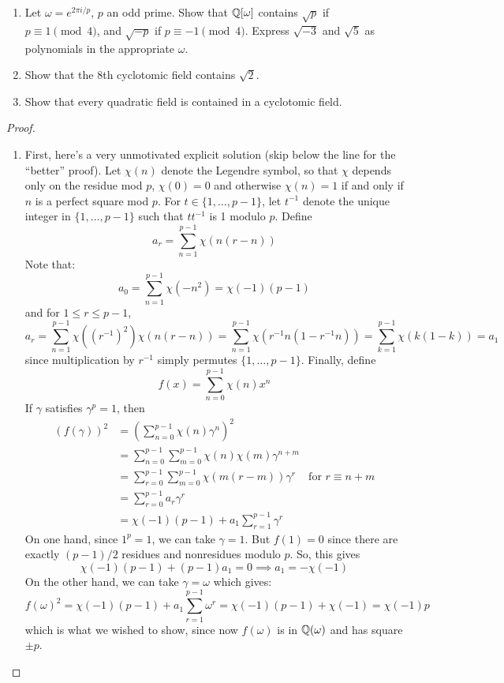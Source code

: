 \begin{exe}{2.8} ${}$
\begin{enumerate}
\item Let $\omega = e^{2\pi i/p}$, $p$ an odd prime. Show that $\mathbb{Q}[\omega]$ contains $\sqrt{p}$ if $p \equiv 1 \pmod{4}$, and $\sqrt{-p}$ if $p \equiv -1 \pmod{4}$. Express $\sqrt{-3}$ and $\sqrt{5}$ as polynomials in the appropriate $\omega$.
\item Show that the 8th cyclotomic field contains $\sqrt{2}$.
\item Show that every quadratic field is contained in a cyclotomic field.
\end{enumerate} \end{exe}

\begin{proof} ${}$
\begin{enumerate}
\item
First, here's a very unmotivated explicit solution (skip below the line for the ``better'' proof). Let $\chi(n)$ denote the Legendre symbol, so that $\chi$ depends only on the residue mod $p$, $\chi(0) = 0$ and otherwise $\chi(n)=1$ if and only if $n$ is a perfect square mod $p$. For $t \in \{1,\ldots,p-1\}$, let $t^{-1}$ denote the unique integer in $\{1,\ldots,p-1\}$ such that $tt^{-1}$ is 1 modulo $p$. Define
\[ a_r = \sum_{n=1}^{p-1} \chi(n(r-n)) \]
Note that:
\[ a_0 = \sum_{n=1}^{p-1} \chi(-n^2) = \chi(-1)(p-1) \]
and for $1 \leq r \leq p-1$,
\[ a_r = \sum_{n=1}^{p-1} \chi((r^{-1})^2)\chi(n(r-n)) = \sum_{n=1}^{p-1} \chi(r^{-1}n(1-r^{-1}n)) = \sum_{k=1}^{p-1} \chi(k(1-k)) = a_1 \]
since multiplication by $r^{-1}$ simply permutes $\{1,\ldots,p-1\}$. Finally, define
\[ f(x) = \sum_{n=0}^{p-1} \chi(n)x^n \]
If $\gamma$ satisfies $\gamma^p = 1$, then
\begin{align*}
(f(\gamma))^2
    &= \left(\sum_{n=0}^{p-1} \chi(n)\gamma^n\right)^2 \\
    &= \sum_{n=0}^{p-1} \sum_{m=0}^{p-1} \chi(n)\chi(m)\gamma^{n+m} \\
    &= \sum_{r=0}^{p-1} \sum_{m=0}^{p-1} \chi(m(r-m))\gamma^r & \text{for } r \equiv n+m \\
    &= \sum_{r=0}^{p-1} a_r\gamma^r \\
    &= \chi(-1)(p-1) + a_1\sum_{r=1}^{p-1} \gamma^r
\end{align*}
On one hand, since $1^p=1$, we can take $\gamma = 1$. But $f(1) = 0$ since there are exactly $(p-1)/2$ residues and nonresidues modulo $p$. So, this gives
\[ \chi(-1)(p-1) + (p-1)a_1 = 0 \implies a_1 = -\chi(-1) \]
On the other hand, we can take $\gamma = \omega$ which gives:
\[ f(\omega)^2 = \chi(-1)(p-1) + a_1\sum_{r=1}^{p-1} \omega^r = \chi(-1)(p-1) + \chi(-1) = \chi(-1)p \]
which is what we wished to show, since now $f(\omega)$ is in $\mathbb{Q}(\omega)$ and has square $\pm p$.


\end{enumerate}
\end{proof}
